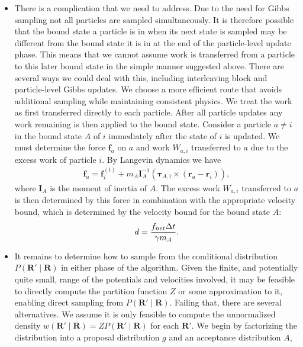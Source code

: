 \documentclass[12pt,letterpaper]{article}
\newcommand{\mb}{\mathbf}
\begin{document}
\begin{itemize}
\begin{align*}
\mb{f}_{torque} = {\mb{r} - \mb{r}_{A} \over |\mb{r} - \mb{r}_{A}|^{2}} \times \boldsymbol{\tau}_{A},
\end{align*}
the force applied on $b$ by the torque, and $\mb{s}$ is a vector corresponding to the proposed state update on $a$. As previously we add the remaining kinetic energy to the corresponding excess work $W_{ex}$ and update the velocity bound appropriately.
\item There is a complication that we need to address. Due to the need for Gibbs sampling not all particles are sampled simultaneously. It is therefore possible that the bound state a particle is in when its next state is sampled may be different from the bound state it is in at the end of the particle-level update phase. This means that we cannot assume work is transferred from a particle to this later bound state in the simple manner suggested above. There are several ways we could deal with this, including interleaving block and particle-level Gibbs updates. We choose a more efficient route that avoids additional sampling while maintaining consistent physics. We treat the work as first transferred directly to each particle. After all particle updates any work remaining is then applied to the bound state. Consider a particle $a \neq i$ in the bound state $A$ of $i$ immediately after the state of $i$ is updated. We must determine the force $\mb{f}_{a}$ on $a$ and work $W_{a,i}$ transferred to $a$ due to the excess work of particle $i$. By Langevin dynamics we have
\begin{align*}
\mb{f}_{a} = \mb{f}^{(t)}_{i} + m_{A}\mb{I}_{A}^{-1}(\boldsymbol{\tau}_{A, i} \times (\mb{r}_{a} - \mb{r}_{i})),
\end{align*}
where $\mb{I}_{A}$ is the moment of inertia of $A$. The excess work $W_{a,i}$ transferred to $a$ is then determined by this force in combination with the appropriate velocity bound, which is determined by the velocity bound for the bound state $A$:
\begin{align*}
d = {f_{net}\Delta t \over \gamma m_{A}}.
\end{align*}
\item It remains to determine how to sample from the conditional distribution $P(\mb{R}' \mid \mb{R})$ in either phase of the algorithm. Given the finite, and potentially quite small, range of the potentials and velocities involved, it may be feasible to directly compute the partition function $Z$ or some approximation to it, enabling direct sampling from $P(\mb{R}' \mid \mb{R})$. Failing that, there are several alternatives. We assume it is only feasible to compute the unnormalized density $w(\mb{R}' \mid \mb{R}) = ZP(\mb{R}' \mid \mb{R})$ for each $\mb{R}'$. We begin by factorizing the distribution into a proposal distribution $g$ and an acceptance distribution $A$,

\end{itemize}
\end{document}
